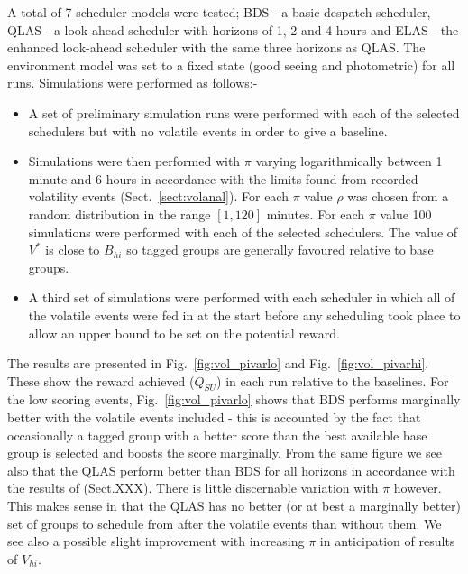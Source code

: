 A total of 7 scheduler models were tested; BDS - a basic despatch scheduler, QLAS - a look-ahead scheduler with horizons of 1, 2 and 4 hours and ELAS - the enhanced look-ahead scheduler with the same three horizons as QLAS. The environment model was set to a fixed state (good seeing and photometric) for all runs. Simulations were performed as follows:-

\begin{itemize}
\item A set of preliminary simulation runs were performed with each of the selected schedulers but with no volatile events in order to give a baseline.
\item Simulations were then performed with $\pi$ varying logarithmically between 1 minute and 6 hours  in accordance with the limits found from recorded volatility events (Sect.~\ref{sect:volanal}). For each $\pi$ value $\rho$ was chosen from a random distribution in the range $[1, 120]$ minutes. For each $\pi$ value 100 simulations were performed with each of the selected schedulers. The value of $V^*$ is close to $B_{hi}$ so tagged groups are generally favoured relative to base groups.
\item A third set of simulations were performed with each scheduler in which all of the volatile events were fed in at the start before any scheduling took place to allow an upper bound to be set on the potential reward.
\end{itemize}

The results are presented in Fig.~\ref{fig:vol_pivarlo} and  Fig.~\ref{fig:vol_pivarhi}. These show the reward achieved ($Q_{SU}$) in each run relative to the baselines.   
For the low scoring events, Fig.~\ref{fig:vol_pivarlo} shows that BDS performs marginally better with the volatile events included - this is accounted by the fact that occasionally a tagged group with a better score than the best available base group is selected and boosts the score marginally. From the same figure we see also that the QLAS perform better than BDS for all horizons in accordance with the results of (Sect.XXX). There is little discernable variation with $\pi$ however. This makes sense in that the QLAS has no better (or at best a marginally better) set of groups to schedule from after the volatile events than without them. We see also a possible slight improvement with increasing $\pi$ in anticipation of results of $V_{hi}$.

